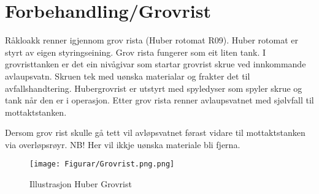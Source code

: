 \newpage
\section{Forbehandling/Grovrist}
Råkloakk renner igjennom grov rista (Huber rotomat R09). Huber rotomat er styrt av eigen styringseining.
Grov rista fungerer som eit liten tank. I grovristtanken er det ein nivågivar som startar grovrist skrue ved innkommande avlaupsvatn. 
Skruen tek med uønska materialar og frakter det til avfallshandtering. Hubergrovrist er utstyrt med spyledyser som spyler skrue og tank når den er i operasjon.
Etter grov rista renner avlaupsvatnet med sjølvfall til mottaktstanken.

Dersom grov rist skulle gå tett vil avløpsvatnet førast vidare til mottaktstanken via overløpsrøyr. NB! Her vil ikkje uønska materiale bli fjerna.

\begin{figure}[htbp]
    \centering
    \texttt{[image: Figurar/Grovrist.png.png]}
    \caption{Illustrasjon Huber Grovrist}\label{fig:Huber Grovrist}
\end{figure}
    

